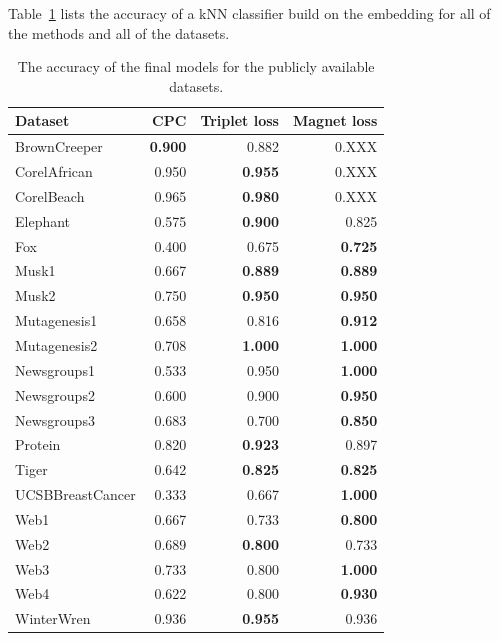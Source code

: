 Table~\ref{tab:public-accuracy} lists the accuracy of a kNN classifier build on the embedding for all of the methods and all of the datasets.

\begin{table}[h!]
  \centering
  \begin{tabular}{lrrr}
    \toprule
    Dataset          & CPC            & Triplet loss   & Magnet loss \\
    \midrule
    BrownCreeper     & \textbf{0.900} & 0.882          & 0.XXX \\
    CorelAfrican     & 0.950          & \textbf{0.955} & 0.XXX \\
    CorelBeach       & 0.965          & \textbf{0.980} & 0.XXX \\
    Elephant         & 0.575          & \textbf{0.900} & 0.825 \\
    Fox              & 0.400          & 0.675          & \textbf{0.725} \\
    Musk1            & 0.667          & \textbf{0.889} & \textbf{0.889} \\
    Musk2            & 0.750          & \textbf{0.950} & \textbf{0.950} \\
    Mutagenesis1     & 0.658          & 0.816          & \textbf{0.912} \\
    Mutagenesis2     & 0.708          & \textbf{1.000} & \textbf{1.000} \\
    Newsgroups1      & 0.533          & 0.950          & \textbf{1.000} \\
    Newsgroups2      & 0.600          & 0.900          & \textbf{0.950} \\
    Newsgroups3      & 0.683          & 0.700          & \textbf{0.850} \\
    Protein          & 0.820          & \textbf{0.923} & 0.897 \\
    Tiger            & 0.642          & \textbf{0.825} & \textbf{0.825} \\
    UCSBBreastCancer & 0.333          & 0.667          & \textbf{1.000} \\
    Web1             & 0.667          & 0.733          & \textbf{0.800} \\
    Web2             & 0.689          & \textbf{0.800} & 0.733 \\
    Web3             & 0.733          & 0.800          & \textbf{1.000} \\
    Web4             & 0.622          & 0.800          & \textbf{0.930} \\
    WinterWren       & 0.936          & \textbf{0.955} & 0.936 \\
    \bottomrule
  \end{tabular}
  \caption{The accuracy of the final models for the publicly available datasets.}\label{tab:public-accuracy}
\end{table}

